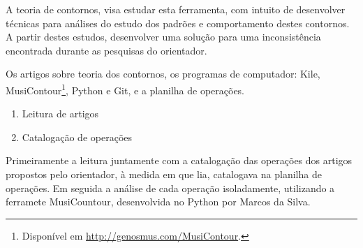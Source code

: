 \documentclass[11pt]{article}
\begin{document}
A teoria de contornos, visa estudar esta ferramenta, com intuito de
desenvolver técnicas para análises do estudo dos padrões e
comportamento destes contornos.
A partir destes estudos, desenvolver uma solução para uma
inconsistência encontrada durante as pesquisas do orientador.

\label{sec:materiais}


Os artigos sobre teoria dos contornos, os programas de computador:
Kile, MusiContour\footnote{Disponível em
  \url{http://genosmus.com/MusiContour}.}, Python e Git, e a planilha
de operações.


\begin{enumerate}
\item Leitura de artigos
\item Catalogação de operações
\end{enumerate}


Primeiramente a leitura juntamente com a catalogação das operações dos
artigos propostos pelo orientador, à medida em que lia, catalogava na
planilha de operações.
Em seguida a análise de cada operação isoladamente, utilizando a
ferramete MusiCountour, desenvolvida no Python por Marcos da Silva.
\end{document}
